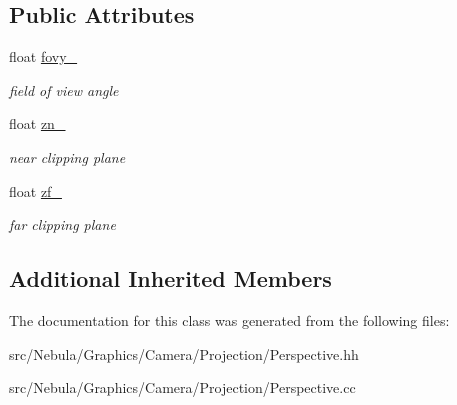 \subsection*{Public Attributes}
\begin{DoxyCompactItemize}
\item 
\hypertarget{classNeb_1_1Camera_1_1Projection_1_1Perspective_acd963786dcbf15670368dcf0eed43536}{float \hyperlink{classNeb_1_1Camera_1_1Projection_1_1Perspective_acd963786dcbf15670368dcf0eed43536}{fovy\-\_\-}}\label{classNeb_1_1Camera_1_1Projection_1_1Perspective_acd963786dcbf15670368dcf0eed43536}

\begin{DoxyCompactList}\small\item\em field of view angle \end{DoxyCompactList}\item 
\hypertarget{classNeb_1_1Camera_1_1Projection_1_1Perspective_a86580bab97702e0ca4d0f0bf19a1fa65}{float \hyperlink{classNeb_1_1Camera_1_1Projection_1_1Perspective_a86580bab97702e0ca4d0f0bf19a1fa65}{zn\-\_\-}}\label{classNeb_1_1Camera_1_1Projection_1_1Perspective_a86580bab97702e0ca4d0f0bf19a1fa65}

\begin{DoxyCompactList}\small\item\em near clipping plane \end{DoxyCompactList}\item 
\hypertarget{classNeb_1_1Camera_1_1Projection_1_1Perspective_a5ad4e81260a9a1a38cd0d7ed23979184}{float \hyperlink{classNeb_1_1Camera_1_1Projection_1_1Perspective_a5ad4e81260a9a1a38cd0d7ed23979184}{zf\-\_\-}}\label{classNeb_1_1Camera_1_1Projection_1_1Perspective_a5ad4e81260a9a1a38cd0d7ed23979184}

\begin{DoxyCompactList}\small\item\em far clipping plane \end{DoxyCompactList}\end{DoxyCompactItemize}
\subsection*{Additional Inherited Members}


The documentation for this class was generated from the following files\-:\begin{DoxyCompactItemize}
\item 
src/\-Nebula/\-Graphics/\-Camera/\-Projection/Perspective.\-hh\item 
src/\-Nebula/\-Graphics/\-Camera/\-Projection/Perspective.\-cc\end{DoxyCompactItemize}
